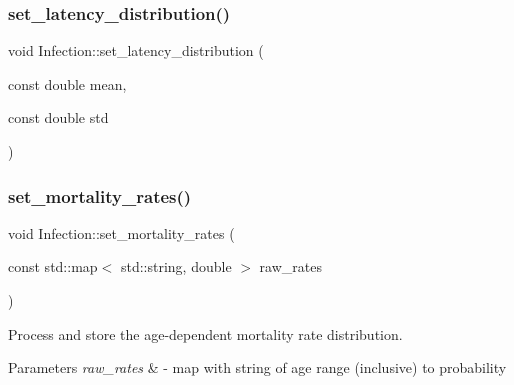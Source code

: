\mbox{\label{classInfection_a005677b5642cfca109812569c0e36e51}} 
\subsubsection{\texorpdfstring{set\+\_\+latency\+\_\+distribution()}{set\_latency\_distribution()}}
{\footnotesize\ttfamily void Infection\+::set\+\_\+latency\+\_\+distribution (\begin{DoxyParamCaption}\item[{const double}]{mean,  }\item[{const double}]{std }\end{DoxyParamCaption})\hspace{0.3cm}{\ttfamily [inline]}}

\mbox{\label{classInfection_a9fa94be47902e58b63d64fbae66bca91}} 
\subsubsection{\texorpdfstring{set\+\_\+mortality\+\_\+rates()}{set\_mortality\_rates()}}
{\footnotesize\ttfamily void Infection\+::set\+\_\+mortality\+\_\+rates (\begin{DoxyParamCaption}\item[{const std\+::map$<$ std\+::string, double $>$}]{raw\+\_\+rates }\end{DoxyParamCaption})}



Process and store the age-\/dependent mortality rate distribution. 


\begin{DoxyParams}{Parameters}
{\em raw\+\_\+rates} & -\/ map with string of age range (inclusive) to probability \\
\hline
\end{DoxyParams}
\mbox{\label{classInfection_acff99a62401e4d7f5a74502adcd8ae18}} 
